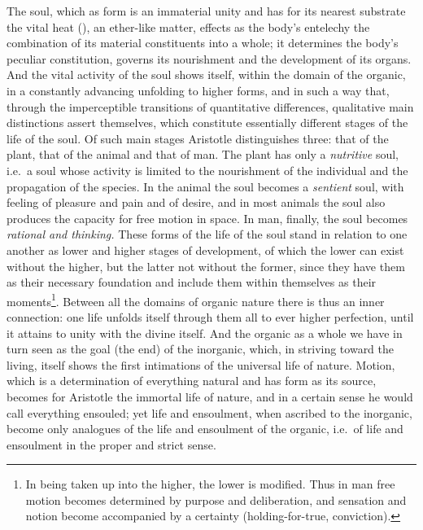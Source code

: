 The soul, which as form is an immaterial unity and has for its nearest substrate the vital heat (), an ether-like matter, effects as the body's entelechy the combination of its material constituents into a whole; it determines the body's
 \setcounter{footnote}{0}
peculiar constitution, governs its nourishment and the development of its organs. And the vital activity of the soul shows itself, within the domain of the organic, in a constantly advancing unfolding to higher forms, and in such a way that, through the imperceptible transitions of quantitative differences, qualitative main distinctions assert themselves, which constitute essentially different stages of the life of the soul. Of such main stages Aristotle distinguishes three: that of the plant, that of the animal and that of man. The plant has only a \emph{nutritive} soul, i.e.\ a soul whose activity is limited to the nourishment of the individual and the propagation of the species. In the animal the soul becomes a \emph{sentient} soul, with feeling of pleasure and pain and of desire, and in most animals the soul also produces the capacity for free motion in space. In man, finally, the soul becomes \emph{rational and thinking.} These forms of the life of the soul stand in relation to one another as lower and
higher stages of development, of which the lower can exist without the higher, but the latter not without the former, since they have them as their necessary foundation and include them within themselves as their moments\footnote{In being taken up into the higher, the lower is modified. Thus in man free motion becomes determined by purpose and deliberation, and sensation and notion become accompanied by a certainty (holding-for-true, conviction).}. Between all the domains of organic nature there is thus an inner connection: one life unfolds itself through them all to ever higher perfection, until it attains to unity with the divine itself. And the organic as a whole we have in turn seen as the goal (the end) of the inorganic, which, in striving toward the living, itself shows the first intimations of the universal life of nature. Motion, which is a determination of everything natural and has form as its source, becomes for Aristotle the immortal life of nature, and in a certain sense he would call everything ensouled; yet life and ensoulment, when ascribed to the inorganic, become only analogues of the life and ensoulment of the organic, i.e.\ of life and ensoulment in the proper and strict sense.
